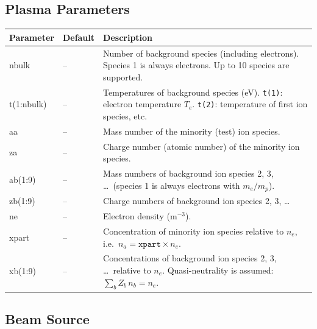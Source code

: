 \documentclass[11pt,a4paper]{article}
\begin{document}
\subsection{Plasma Parameters}

\begin{longtable}{>{\ttfamily}p{3.2cm} p{1.5cm} p{9cm}}
\toprule
\normalfont Parameter & Default & Description \\
\midrule
\endhead
\bottomrule
\endlastfoot

nbulk & -- &
  Number of background species (including electrons).
  Species 1 is always electrons.  Up to 10 species are supported. \\[4pt]

t(1:nbulk) & -- &
  Temperatures of background species (eV).
  \texttt{t(1)}: electron temperature $T_e$.
  \texttt{t(2)}: temperature of first ion species, etc. \\[4pt]

aa & -- &
  Mass number of the minority (test) ion species. \\[4pt]

za & -- &
  Charge number (atomic number) of the minority ion species. \\[4pt]

ab(1:9) & -- &
  Mass numbers of background ion species 2, 3, \ldots\ (species 1 is
  always electrons with $m_e/m_p$). \\[4pt]

zb(1:9) & -- &
  Charge numbers of background ion species 2, 3, \ldots \\[4pt]

ne & -- &
  Electron density (m$^{-3}$). \\[4pt]

xpart & -- &
  Concentration of minority ion species relative to $n_e$,
  i.e.\ $n_a = \texttt{xpart} \times n_e$. \\[4pt]

xb(1:9) & -- &
  Concentrations of background ion species 2, 3, \ldots\ relative to $n_e$.
  Quasi-neutrality is assumed: $\sum_b Z_b\,n_b = n_e$. \\[4pt]

\end{longtable}

\subsection{Beam Source}
\end{document}

